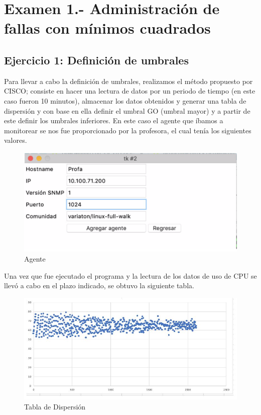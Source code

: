 \section{Examen 1.- Administración de fallas con mínimos cuadrados}
\subsection{Ejercicio 1: Definición de umbrales}
\noindent
Para llevar a cabo la definición de umbrales, realizamos el método propuesto por CISCO; consiste en hacer una lectura de datos por un periodo de tiempo (en este caso fueron 10 minutos), almacenar los datos obtenidos y generar una tabla de dispersión y con base en ella definir el umbral GO (umbral mayor) y a partir de este definir los umbrales inferiores. En este caso el agente que íbamos a monitorear se nos fue proporcionado por la profesora, el cual tenía los siguientes valores.
\begin{figure}[H]
  \centering
    \includegraphics[scale=.8]{imagenes/primero/1-1.png}
    \caption{Agente}
\end{figure}
Una vez que fue ejecutado el programa y la lectura de los datos de uso de CPU se llevó a cabo en el plazo indicado, se obtuvo la siguiente tabla.
\begin{figure}[H]
  \centering
    \includegraphics[scale=1]{imagenes/primero/1.JPG}
    \caption{Tabla de Dispersión}
\end{figure}
